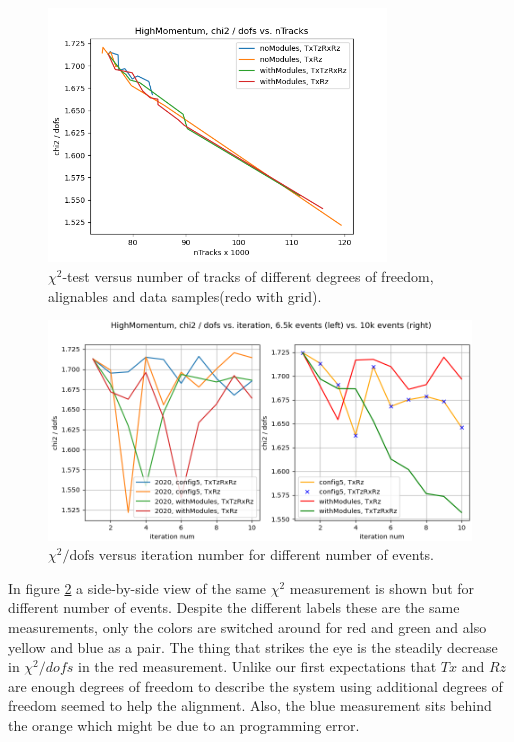 \begin{figure}
  \centering
  \includegraphics[width=0.8\textwidth]{plots/nov_21/chi2_vs_ntracks_all.png}
  \caption{$\chi^2$-test versus number of tracks of different degrees of freedom, alignables and data samples(redo with grid).}
  \label{fig:chi2tracks}
\end{figure}

\begin{figure}
  \centering
  \includegraphics[width=\textwidth]{plots/renewed_plots/e5/4_17.png}
  \caption{$\chi^2 / \text{dofs}$ versus iteration number for different number of events.}
  \label{fig:chi2iterdec}
\end{figure}

In figure \ref{fig:chi2iterdec} a side-by-side view of the same $\chi^2$ measurement
is shown but for different number of events. Despite the different labels these are the same measurements, only the colors are switched around for red and green and also yellow and blue as a pair. The thing that strikes the eye is the steadily decrease in $\chi^2 / dofs$ in the red measurement. Unlike our first expectations that $Tx$ and $Rz$ are enough degrees of freedom to describe the system using additional degrees of freedom seemed to help the alignment.
Also, the blue measurement sits behind the orange which might be due to an
programming error.

